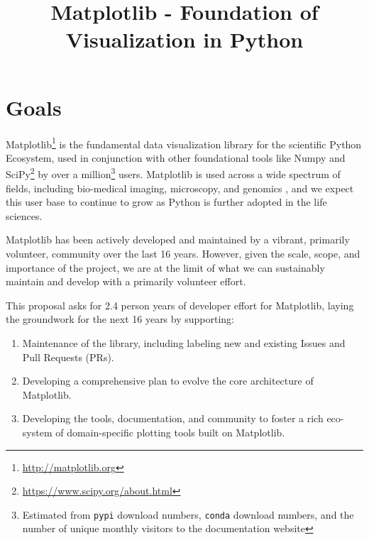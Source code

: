 \documentclass[11pt,letterpaper]{article}  %
\begin{document}
\title{Matplotlib - Foundation of Visualization in Python}
\author{}
\maketitle

\section{Goals}

Matplotlib\footnote{\url{http://matplotlib.org}} is the fundamental
data visualization library for the scientific Python Ecosystem, used
in conjunction with other foundational tools like Numpy and
SciPy\footnote{\url{https://www.scipy.org/about.html}} by over a
million\footnote{Estimated from \texttt{pypi} download numbers,
\texttt{conda} download numbers, and the number of unique monthly
visitors to the documentation website} users.  Matplotlib is used
across a wide spectrum of fields, including bio-medical imaging,
microscopy, and genomics
\cite{Carpenter2006,Wolf2018,10.7717/peerj.453,
  Segata2011,10.1371/journal.pgen.1000695,HASHIMSHONY2012666,
  10.1093/bioinformatics/bts480,Carlile2014,Laganowsky2014,Jiangaac9462,
  10.3389/fninf.2014.00014}, and we expect this user base to continue
to grow as Python is further adopted in the life sciences.

Matplotlib has been actively developed and maintained by a vibrant,
primarily volunteer, community over the last 16 years.  However, given
the scale, scope, and importance of the project, we are at the limit
of what we can sustainably maintain and develop with a primarily
volunteer effort.

This proposal asks for 2.4 person years of developer effort for
Matplotlib, laying the groundwork for the next 16 years by supporting:

\begin{enumerate}[label=\alph*),noitemsep]
  \item Maintenance of the library, including labeling new and
    existing Issues and Pull Requests (PRs).
  \item Developing a comprehensive plan to evolve the core architecture
    of Matplotlib.
  \item Developing the tools, documentation, and community to foster a
    rich eco-system of domain-specific plotting tools built on
    Matplotlib.
\end{enumerate}


\end{document}
